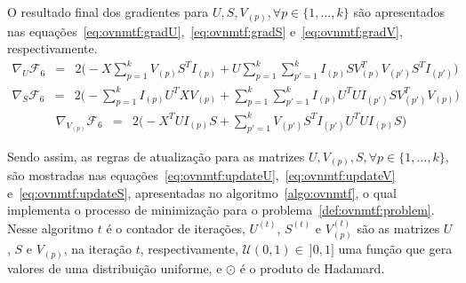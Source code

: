 \documentclass[
    12pt,                %
    oneside,            %
    a4paper,            %
    english,            %
    brazil                %
    ]{abntex2ppgsi}
\begin{document}
O resultado final dos gradientes para $U, S, V_{(p)}, \forall p \in \{1, \dots, k\}$ são apresentados nas equações~\ref{eq:ovnmtf:gradU},~\ref{eq:ovnmtf:gradS} e~\ref{eq:ovnmtf:gradV}, respectivamente.
\begin{equation}
\label{eq:ovnmtf:gradU}
    \begin{array}{lcl}
        \nabla_U \mathcal{F}_6 & = & 2 \big( - X \sum_{p=1}^{k} V_{(p)} S^T I_{(p)} + U \sum_{p=1}^k \sum_{p'=1}^{k} I_{(p)} S V_{(p)}^T V_{(p')} S^T I_{(p')} \big)
    \end{array}
\end{equation}
\begin{equation}
\label{eq:ovnmtf:gradS}
    \begin{array}{lcl}
        \nabla_S \mathcal{F}_6 & = & 2 \big( - \sum_{p=1}^{k} I_{(p)} U^T X V_{(p)} + \sum_{p=1}^{k} \sum_{p'=1}^{k} I_{(p)} U^T U I_{(p')} S V_{(p')}^T V_{(p)} \big)
    \end{array}
\end{equation}
\begin{equation}
\label{eq:ovnmtf:gradV}
    \begin{array}{lcl}
        \nabla_{V_{(p)}} \mathcal{F}_6 & = & 2 \big( -X^T U I_{(p)} S + \sum_{p'=1}^{k} V_{(p')} S^T I_{(p')} U^T U I_{(p)} S \big)
    \end{array}
\end{equation}

Sendo assim, as regras de atualização para as matrizes $U, V_{(p)}, S, \forall p \in \{1, \dots, k\}$, são mostradas nas equações~\ref{eq:ovnmtf:updateU},~\ref{eq:ovnmtf:updateV} e~\ref{eq:ovnmtf:updateS}, apresentadas no algoritmo~\ref{algo:ovnmtf}, o qual implementa o processo de minimização para o problema~\ref{def:ovnmtf:problem}.
Nesse algoritmo $t$ é o contador de iterações, $U^{(t)}$, $S^{(t)}$ e $V_{(p)}^{(t)}$ são as matrizes $U$, $S$ e $V_{(p)}$, na iteração $t$, respectivamente, $\mathcal{U}(0, 1) \in~]0, 1]$ uma função que gera valores de uma distribuição uniforme, e $\odot$ é o produto de Hadamard.

\end{document}
